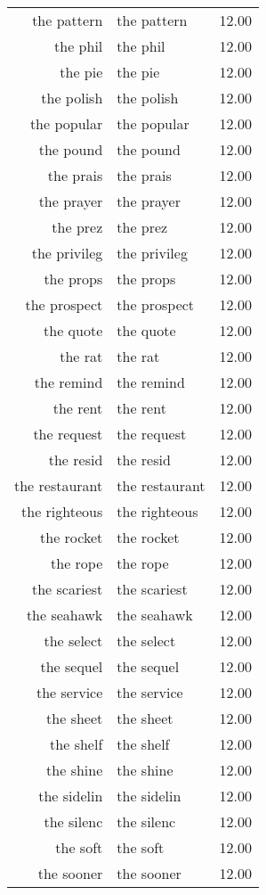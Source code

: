 \begin{table}[ht]
\begin{tabular}{rlr}
  the pattern & the pattern & 12.00 \\ 
  the phil & the phil & 12.00 \\ 
  the pie & the pie & 12.00 \\ 
  the polish & the polish & 12.00 \\ 
  the popular & the popular & 12.00 \\ 
  the pound & the pound & 12.00 \\ 
  the prais & the prais & 12.00 \\ 
  the prayer & the prayer & 12.00 \\ 
  the prez & the prez & 12.00 \\ 
  the privileg & the privileg & 12.00 \\ 
  the props & the props & 12.00 \\ 
  the prospect & the prospect & 12.00 \\ 
  the quote & the quote & 12.00 \\ 
  the rat & the rat & 12.00 \\ 
  the remind & the remind & 12.00 \\ 
  the rent & the rent & 12.00 \\ 
  the request & the request & 12.00 \\ 
  the resid & the resid & 12.00 \\ 
  the restaurant & the restaurant & 12.00 \\ 
  the righteous & the righteous & 12.00 \\ 
  the rocket & the rocket & 12.00 \\ 
  the rope & the rope & 12.00 \\ 
  the scariest & the scariest & 12.00 \\ 
  the seahawk & the seahawk & 12.00 \\ 
  the select & the select & 12.00 \\ 
  the sequel & the sequel & 12.00 \\ 
  the service & the service & 12.00 \\ 
  the sheet & the sheet & 12.00 \\ 
  the shelf & the shelf & 12.00 \\ 
  the shine & the shine & 12.00 \\ 
  the sidelin & the sidelin & 12.00 \\ 
  the silenc & the silenc & 12.00 \\ 
  the soft & the soft & 12.00 \\ 
  the sooner & the sooner & 12.00 \\ 

\end{tabular}
\end{table}
